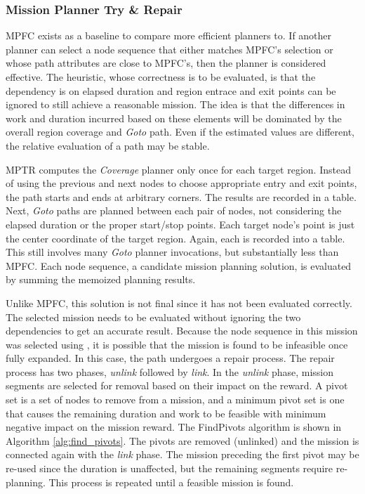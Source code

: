 \documentclass{tamuccthesis}
\begin{document}

\subsubsection{Mission Planner Try \& Repair}

MPFC exists as a baseline to compare more efficient planners to. If another planner can select a node sequence that either matches MPFC's selection or whose path attributes are close to MPFC's, then the planner is considered effective. The heuristic, whose correctness is to be evaluated, is that the dependency is on elapsed duration and region entrace and exit points can be ignored to still achieve a reasonable mission. The idea is that the differences in work and duration incurred based on these elements will be dominated by the overall region coverage and \textit{Goto} path. Even if the estimated values are different, the relative evaluation of a path may be stable. 

MPTR computes the \textit{Coverage} planner only once for each target region. Instead of using the previous and next nodes to choose appropriate entry and exit points, the path starts and ends at arbitrary corners. The results are recorded in a table. Next, \textit{Goto} paths are planned between each pair of nodes, not considering the elapsed duration or the proper start/stop points. Each target node's point is just the center coordinate of the target region. Again, each is recorded into a table. This still involves many \textit{Goto} planner invocations, but substantially less than MPFC. Each node sequence, a candidate mission planning solution, is evaluated by summing the memoized planning results. 

Unlike MPFC, this solution is not final since it has not been evaluated correctly. The selected mission needs to be evaluated without ignoring the two dependencies to get an accurate result. Because the node sequence in this mission was selected using , it is possible that the mission is found to be infeasible once fully expanded. In this case, the path undergoes a repair process. The repair process has two phases, \textit{unlink} followed by \textit{link}. In the \textit{unlink} phase, mission segments are selected for removal based on their impact on the reward. A pivot set is a set of nodes to remove from a mission, and a minimum pivot set is one that causes the remaining duration and work to be feasible with minimum negative impact on the mission reward. The FindPivots algorithm is shown in Algorithm \ref{alg:find_pivots}. The pivots are removed (unlinked) and the mission is connected again with the \textit{link} phase. The mission preceding the first pivot may be re-used since the duration is unaffected, but the remaining segments require re-planning. This process is repeated until a feasible mission is found. 
\end{document}
